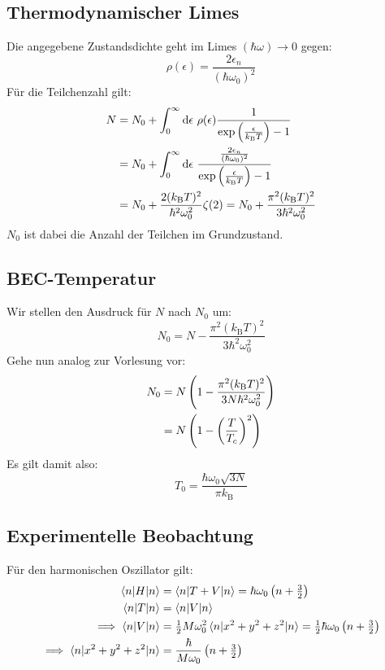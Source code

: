 \subsection{Thermodynamischer Limes}
Die angegebene Zustandsdichte geht im Limes $(\hbar \omega) \longrightarrow 0$ gegen:
\[\rho(\epsilon) = \frac{2\epsilon_n}{(\hbar \omega_0)^2} \]
Für die Teilchenzahl gilt:
\begin{align*}
N &= N_0 + \int_0^\infty \dif \epsilon \ \rho(\epsilon) \frac{1}{\exp\del{\frac{\epsilon}{k_\text{B} T}}-1} \\
&= N_0 + \int_0^\infty \dif \epsilon \  \frac{\frac{2\epsilon_n}{(\hbar \omega_0)^2}}{\exp\del{\frac{\epsilon}{k_\text{B} T}}-1} \\
&= N_0 + \frac{2(k_\text{B} T)^2}{\hbar^2 \omega_0^2} \zeta(2) = N_0 + \frac{\pi^2 (k_\text{B} T)^2}{3 \hbar^2 \omega_0^2}
\end{align*}
$N_0$ ist dabei die Anzahl der Teilchen im Grundzustand.

\subsection{BEC-Temperatur}
Wir stellen den Ausdruck für $N$ nach $N_0$ um:
\[N_0 = N - \frac{\pi^2 (k_\text{B} T)^2}{3 \hbar^2 \omega_0^2} \]
Gehe nun analog zur Vorlesung vor:
\begin{align*}
N_0 &= N\del{1 - \frac{\pi^2 (k_\text{B} T)^2}{3N \hbar^2 \omega_0^2}} \\
&= N \del{1-\del{\frac{T}{T_c}}^2} \\
\end{align*}
Es gilt damit also:
\[T_0 = \frac{\hbar \omega_0 \sqrt{3N}}{\pi k_\text{B}} \]

\subsection{Experimentelle Beobachtung}
Für den harmonischen Oszillator gilt:
\begin{align*}
\braket{n|H|n} &= \braket{n|T+V|n} = \hbar \omega_0 \del {n+\tfrac{3}{2}} \\
\braket{n|T|n} &= \braket{n|V|n} \\
\implies \braket{n|V|n} &= \tfrac{1}{2} M \omega_0^2 \braket{n|x^2+y^2+z^2|n} =  \tfrac{1}{2} \hbar \omega_0 \del {n+\tfrac{3}{2}} \\
\implies \braket{n|x^2+y^2+z^2|n} &= \frac{\hbar}{M\omega_0} \del{n+\tfrac{3}{2}}
\end{align*}

\IfFileExists{\bibliographyfile}{
    \printbibliography
}{}





